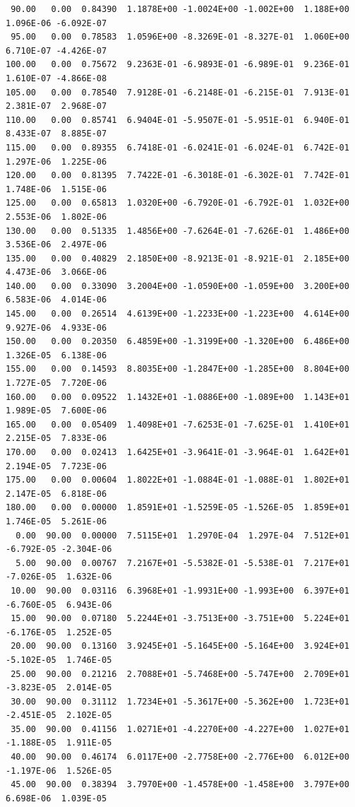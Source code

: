 \begin{appendix}
{\begin{verbatim}
 90.00   0.00  0.84390  1.1878E+00 -1.0024E+00 -1.002E+00  1.188E+00  1.096E-06 -6.092E-07
 95.00   0.00  0.78583  1.0596E+00 -8.3269E-01 -8.327E-01  1.060E+00  6.710E-07 -4.426E-07
100.00   0.00  0.75672  9.2363E-01 -6.9893E-01 -6.989E-01  9.236E-01  1.610E-07 -4.866E-08
105.00   0.00  0.78540  7.9128E-01 -6.2148E-01 -6.215E-01  7.913E-01  2.381E-07  2.968E-07
110.00   0.00  0.85741  6.9404E-01 -5.9507E-01 -5.951E-01  6.940E-01  8.433E-07  8.885E-07
115.00   0.00  0.89355  6.7418E-01 -6.0241E-01 -6.024E-01  6.742E-01  1.297E-06  1.225E-06
120.00   0.00  0.81395  7.7422E-01 -6.3018E-01 -6.302E-01  7.742E-01  1.748E-06  1.515E-06
125.00   0.00  0.65813  1.0320E+00 -6.7920E-01 -6.792E-01  1.032E+00  2.553E-06  1.802E-06
130.00   0.00  0.51335  1.4856E+00 -7.6264E-01 -7.626E-01  1.486E+00  3.536E-06  2.497E-06
135.00   0.00  0.40829  2.1850E+00 -8.9213E-01 -8.921E-01  2.185E+00  4.473E-06  3.066E-06
140.00   0.00  0.33090  3.2004E+00 -1.0590E+00 -1.059E+00  3.200E+00  6.583E-06  4.014E-06
145.00   0.00  0.26514  4.6139E+00 -1.2233E+00 -1.223E+00  4.614E+00  9.927E-06  4.933E-06
150.00   0.00  0.20350  6.4859E+00 -1.3199E+00 -1.320E+00  6.486E+00  1.326E-05  6.138E-06
155.00   0.00  0.14593  8.8035E+00 -1.2847E+00 -1.285E+00  8.804E+00  1.727E-05  7.720E-06
160.00   0.00  0.09522  1.1432E+01 -1.0886E+00 -1.089E+00  1.143E+01  1.989E-05  7.600E-06
165.00   0.00  0.05409  1.4098E+01 -7.6253E-01 -7.625E-01  1.410E+01  2.215E-05  7.833E-06
170.00   0.00  0.02413  1.6425E+01 -3.9641E-01 -3.964E-01  1.642E+01  2.194E-05  7.723E-06
175.00   0.00  0.00604  1.8022E+01 -1.0884E-01 -1.088E-01  1.802E+01  2.147E-05  6.818E-06
180.00   0.00  0.00000  1.8591E+01 -1.5259E-05 -1.526E-05  1.859E+01  1.746E-05  5.261E-06
  0.00  90.00  0.00000  7.5115E+01  1.2970E-04  1.297E-04  7.512E+01 -6.792E-05 -2.304E-06
  5.00  90.00  0.00767  7.2167E+01 -5.5382E-01 -5.538E-01  7.217E+01 -7.026E-05  1.632E-06
 10.00  90.00  0.03116  6.3968E+01 -1.9931E+00 -1.993E+00  6.397E+01 -6.760E-05  6.943E-06
 15.00  90.00  0.07180  5.2244E+01 -3.7513E+00 -3.751E+00  5.224E+01 -6.176E-05  1.252E-05
 20.00  90.00  0.13160  3.9245E+01 -5.1645E+00 -5.164E+00  3.924E+01 -5.102E-05  1.746E-05
 25.00  90.00  0.21216  2.7088E+01 -5.7468E+00 -5.747E+00  2.709E+01 -3.823E-05  2.014E-05
 30.00  90.00  0.31112  1.7234E+01 -5.3617E+00 -5.362E+00  1.723E+01 -2.451E-05  2.102E-05
 35.00  90.00  0.41156  1.0271E+01 -4.2270E+00 -4.227E+00  1.027E+01 -1.188E-05  1.911E-05
 40.00  90.00  0.46174  6.0117E+00 -2.7758E+00 -2.776E+00  6.012E+00 -1.197E-06  1.526E-05
 45.00  90.00  0.38394  3.7970E+00 -1.4578E+00 -1.458E+00  3.797E+00  6.698E-06  1.039E-05

\end{verbatim}}
\end{appendix}
